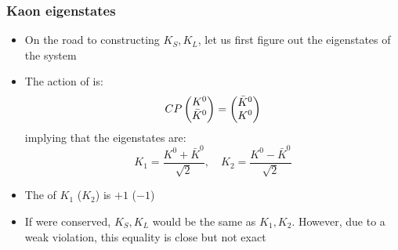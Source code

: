   \subsubsection{Kaon \CP eigenstates}
  \begin{itemize}
    \item On the road to constructing $K_S,K_L$, let us first figure out the \CP eigenstates of the system
    \item The action of \CP is:
    \begin{equation}
      CP \begin{pmatrix} K^0 \\ \bar K^0 \end{pmatrix} = \begin{pmatrix} \bar K^0 \\ K^0 \end{pmatrix}
    \end{equation}
    implying that the \CP eigenstates are:
    \begin{equation}
      K_1 = \frac{K^0 + \bar K^0}{\sqrt2},\quad K_2 = \frac{K^0 - \bar K^0}{\sqrt2}
    \end{equation}
    \item The \CP of $K_1$ ($K_2$) is $+1$ ($-1$)
    \item If \CP were conserved, $K_S,K_L$ would be the same as $K_1,K_2$. However, due to a weak \CP violation, this equality is close but not exact
  \end{itemize}

